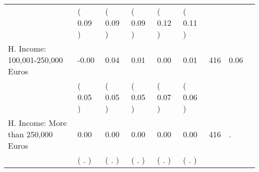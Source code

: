 \begin{tabular}{L{6.2cm} C{1.8cm} C{1.8cm} C{1.8cm} C{1.8cm} C{1.8cm} C{1.8cm} C{0.3cm} C{0.3cm}}
 & (     0.09 ) & (     0.09 ) & (     0.09 ) & (     0.12 ) & (     0.11 )  & \\
H. Income: 100,001-250,000 Euros &     -0.00 &      0.04 &      0.01 &      0.00 &      0.01  & 416 &       0.06 \\ 
 & (     0.05 ) & (     0.05 ) & (     0.05 ) & (     0.07 ) & (     0.06 )  & \\
H. Income: More than 250,000 Euros &      0.00 &      0.00 &      0.00 &      0.00 &      0.00  & 416 &          . \\ 
 & (        . ) & (        . ) & (        . ) & (        . ) & (        . )  & \\
\bottomrule
\end{tabular}
